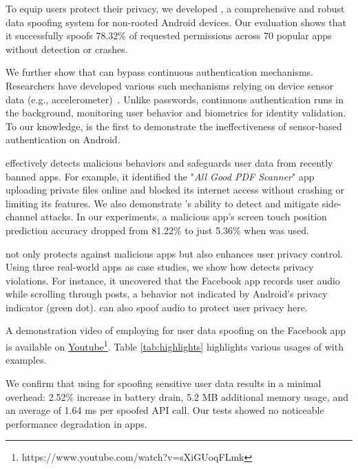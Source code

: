 To equip users protect their privacy, we developed \textit{\framework{}}, a comprehensive and robust data spoofing system for non-rooted Android devices. Our evaluation shows that it successfully spoofs 78.32\% of requested permissions across 70 popular apps without detection or crashes.

We further show that \framework{} can bypass continuous authentication mechanisms. Researchers have developed various such mechanisms relying on device sensor data (e.g., accelerometer)~\cite{sun2018artificial,shih2015flick,jain2015exploring,feng2014tips,li2018using,yan2018towards,song2016eyeveri,xia2018motionhacker,hong2016mgra,johnson2013secure,zhu2013sensec,sitova2015hmog,pang2019mineauth,lee2017implicit}. Unlike passwords, continuous authentication runs in the background, monitoring user behavior and biometrics for identity validation. To our knowledge, \framework{} is the first to demonstrate the ineffectiveness of sensor-based authentication on Android.



\framework{} effectively detects malicious behaviors and safeguards user data from recently banned apps. For example, it identified the "\textit{All Good PDF Scanner}" app uploading private files online and blocked its internet access without crashing or limiting its features. We also demonstrate \framework{}'s ability to detect and mitigate side-channel attacks. In our experiments, a malicious app's screen touch position prediction accuracy dropped from 81.22\% to just 5.36\% when \framework{} was used.

\framework{} not only protects against malicious apps but also enhances user privacy control. Using three real-world apps as case studies, we show how \framework{} detects privacy violations. For instance, it uncovered that the Facebook app records user audio while scrolling through posts, a behavior not indicated by Android's privacy indicator (green dot). \framework{} can also spoof audio to protect user privacy here.

A demonstration video of employing \framework{} for user data spoofing on the Facebook app is available on \href{https://www.youtube.com/watch?v=sXiGUoqFLmk}{Youtube}\footnote{https://www.youtube.com/watch?v=sXiGUoqFLmk}. Table \ref{tab:highlights} highlights various usages of \framework{} with examples.

We confirm that using \framework{} for spoofing sensitive user data results in a minimal overhead: 2.52\% increase in battery drain, 5.2 MB additional memory usage, and an average of 1.64 ms per spoofed API call. Our tests showed no noticeable performance degradation in apps.

